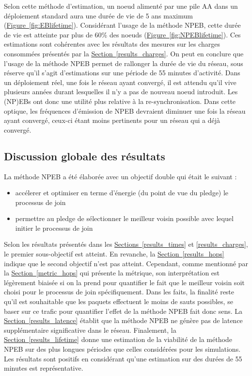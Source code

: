 \documentclass[]{report}
\newcommand{\wordlink}[2]{\hyperref[#2]{#1~\ref{#2}}}
\begin{document}
\vspace{0.2cm}

Selon cette méthode d'estimation, un noeud alimenté par une pile AA dans un déploiement standard aura une durée de vie de 5 ans maximum (\wordlink{Figure}{fig:EBlifetime}). Considérant l'usage de la méthode NPEB, cette durée de vie est atteinte par plus de 60\% des noeuds (\wordlink{Figure}{fig:NPEBlifetime}). Ces estimations sont cohérentes avec les résultats des mesures sur les charges consommées présentés par la \wordlink{Section}{results_charges}. On peut en conclure que l'usage de la méthode NPEB permet de rallonger la durée de vie du réseau, sous réserve qu'il s'agit d'estimations sur une période de 55 minutes d'activité. Dans un déploiement réel, une fois le réseau ayant convergé, il est attendu qu'il vive plusieurs années durant lesquelles il n'y a pas de nouveau noeud introduit. Les (NP)EBs ont donc une utilité plus relative à la re-synchronisation. Dans cette optique, les fréquences d'émission de NPEB devraient diminuer une fois la réseau ayant convergé, ceux-ci étant  moins pertinents pour un réseau qui a déjà convergé.

\newpage

\subsection{Discussion globale des résultats} 

La méthode NPEB a été élaborée avec un objectif double qui était le suivant :
\begin{itemize}[label=$\bullet$]
\item accélerer et optimiser en terme d'énergie (du point de vue du pledge) le processus de join
\item permettre au pledge de sélectionner le meilleur voisin possible avec lequel initier le processus de join
\end{itemize}

\vspace{0.3cm}

Selon les résultats présentés dans les \wordlink{Sections}{results_times} et \ref{results_charges}, le premier sous-objectif est atteint. En revanche, la \wordlink{Section}{results_hops} indique que le second objectif n'est pas atteint. Cependant, comme mentionné par la \wordlink{Section}{metric_hops} qui présente la métrique, son interprétation est légèrement biaisée si on la prend pour quantifier le fait que le meilleur voisin soit choisi pour le processus de join spécifiquement. Dans les faits, la finalité reste qu'il est souhaitable que les paquets effectuent le moins de sauts possibles, se baser sur ce trafic pour quantifier l'effet de la méthode NPEB fait donc sens. La \wordlink{Section}{results_latence} établit que la méthode NPEB ne génère pas de latence supplémentaire significative dans le réseau. Finalement, la \wordlink{Section}{results_lifetime} donne une estimation de la viabilité de la méthode NPEB sur des plus longues périodes que celles considérées pour les simulations. Les résultats sont positifs en considérant qu'une estimation sur des durées de 55 minutes est représentative.\\
\end{document}
